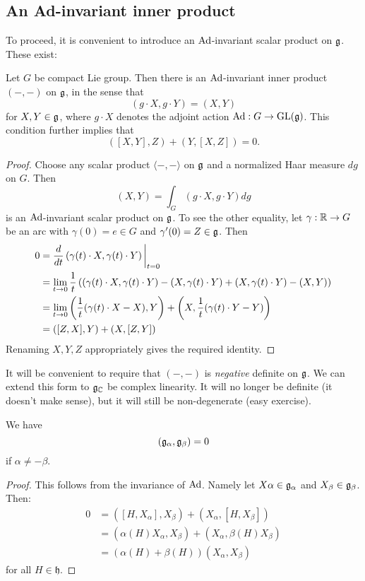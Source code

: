 \documentclass[11pt, english]{article}
\begin{document}
\subsection{An Ad-invariant inner product}

To proceed, it is convenient to introduce an $\operatorname{Ad}$-invariant scalar product on $\mathfrak g$. These exist:

\begin{lemma}
\label{lemmainnerproduct}
Let $G$ be compact Lie group. Then there is an $\operatorname{Ad}$-invariant inner product $( -,-)$ on $\mathfrak g$, in the sense that $$( g \cdot X, g\cdot Y )  = (X , Y )$$
for $X,Y \in \mathfrak g$, where $g \cdot X$ denotes the adjoint action $\operatorname{Ad}:G \to \operatorname{GL}(\mathfrak g)$. This condition further implies that
$$
( [X,Y],Z )  +(Y,[X,Z]) = 0.
$$
\end{lemma}
\begin{proof}
 Choose any scalar product $\langle -,-\rangle $ on $\mathfrak g$ and a normalized Haar measure $dg$ on $G$. Then 
$$
(X,Y ) = \int_G (g \cdot X, g\cdot Y) dg
$$
is an $\operatorname{Ad}$-invariant scalar product on $\mathfrak g$. To see the other equality, let $\gamma:\mathbb{R} \to G$ be an arc with $\gamma(0)=e \in G$ and $\gamma'(0)=Z \in \mathfrak g$. Then
\begin{align*}
0 &=   \restr{\frac{d}{dt}\left( \gamma(t) \cdot X, \gamma(t) \cdot Y \right)}{t = 0} \\
 &= \lim_{t \to 0} \frac 1t \left(( \gamma(t) \cdot X, \gamma(t) \cdot Y ) - ( X, \gamma(t) \cdot  Y ) + ( X, \gamma(t) \cdot Y ) - ( X, Y ) \right) \\
&= \lim_{t \to 0} \left( \frac 1t (\gamma(t) \cdot X - X), Y \right) + \left( X, \frac 1t (\gamma(t) \cdot Y - Y) \right) \\
&= ( [Z,X],Y ) + ( X, [Z,Y])
\end{align*}
Renaming $X,Y,Z$ appropriately gives the required identity.
\end{proof}

It will be convenient to require that $( -,- )$ is \emph{negative} definite on $\mathfrak g$. We can extend this form to $\mathfrak g_{\mathbb{C}}$ be complex linearity. It will no longer be definite (it doesn't make sense), but it will still be non-degenerate (easy exercise). 

\begin{lemma}
We have
$$
(\mathfrak g_\alpha, \mathfrak g_\beta ) = 0
$$
if $\alpha \neq -\beta$.
\end{lemma}
\begin{proof}
This follows from the invariance of $\operatorname{Ad}$. Namely let $X \alpha \in \mathfrak g_\alpha$ and $X_\beta \in \mathfrak g_\beta$. Then:
\begin{align*}
  0 &= ([H,X_\alpha],X_\beta ) + (X_\alpha,[H,X_\beta]) \\
&= (\alpha(H)X_\alpha, X_\beta) + (X_\alpha,\beta(H)X_\beta) \\
&= (\alpha(H)+\beta(H)) (X_\alpha,X_\beta)
\end{align*}
for all $H \in \mathfrak h$.
\end{proof}
\end{document}
